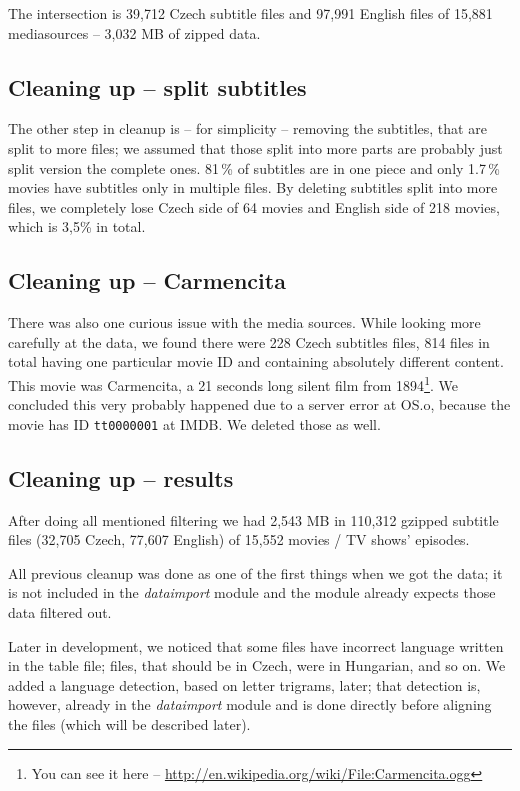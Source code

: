 The intersection is 39,712 Czech subtitle files and 97,991 English files of 15,881 mediasources -- 3,032 MB of zipped data.

\subsection*{Cleaning up -- split subtitles}
The other step in cleanup is -- for simplicity -- removing the subtitles, that are split to more files; we assumed that those split into more parts are probably just split version the complete ones. 81\,\% of subtitles are in one piece and only 1.7\,\% movies have subtitles only in multiple files. By deleting subtitles split into more files, we completely lose Czech side of 64 movies and English side of 218 movies, which is 3,5\% in total.

\subsection*{Cleaning up -- Carmencita}
There was also one curious issue with the media sources. While looking more carefully at the data, we found there were 228 Czech subtitles files, 814 files in total having one particular movie ID and containing absolutely different content. This movie was Carmencita, a 21 seconds long silent film from 1894\footnote{You can see it here -- \url{http://en.wikipedia.org/wiki/File:Carmencita.ogg}}. We concluded this very probably happened due to a server error at OS.o, because the movie has ID {\tt tt0000001} at IMDB. We deleted those as well.


\subsection*{Cleaning up -- results}
After doing all mentioned filtering we had 2,543 MB in 110,312 gzipped subtitle files (32,705 Czech, 77,607 English) of 15,552 movies / TV shows' episodes.

All previous cleanup was done as one of the first things when we got the data; it is not included in the \emph{dataimport} module and the module already expects those data filtered out.

Later in development, we noticed that some files have incorrect language written in the table file; files, that should be in Czech, were in  Hungarian, and so on. We added a language detection, based on letter trigrams, later; that detection is, however, already in the \emph{dataimport} module and is done directly before aligning the files (which will be described later).

